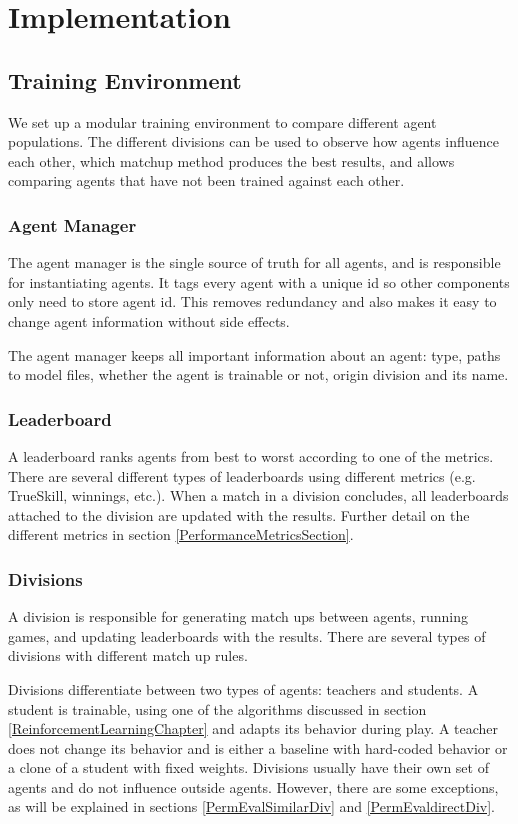 \chapter{Implementation}

\section{Training Environment}
We set up a modular training environment to compare different agent populations. The different divisions can be used to observe how agents influence each other, which matchup method produces the best results, and allows comparing agents that have not been trained against each other.

\subsection{Agent Manager}
The agent manager is the single source of truth for all agents, and is responsible for instantiating agents. It tags every agent with a unique id so other components only need to store agent id. This removes redundancy and also makes it easy to change agent information without side effects.

The agent manager keeps all important information about an agent: type, paths to model files, whether the agent is trainable or not, origin division and its name.

\subsection{Leaderboard}
A leaderboard ranks agents from best to worst according to one of the metrics. There are several different types of leaderboards using different metrics (e.g. TrueSkill, winnings, etc.). When a match in a division concludes, all leaderboards attached to the division are updated with the results. Further detail on the different metrics in section \ref{PerformanceMetricsSection}.

\subsection{Divisions}
A division is responsible for generating match ups between agents, running games, and updating leaderboards with the results. There are several types of divisions with different match up rules.

Divisions differentiate between two types of agents: teachers and students. A student is trainable, using one of the algorithms discussed in section \ref{ReinforcementLearningChapter} and adapts its behavior during play. A teacher does not change its behavior and is either a baseline with hard-coded behavior or a clone of a student with fixed weights. Divisions usually have their own set of agents and do not influence outside agents. However, there are some exceptions, as will be explained in sections \ref{PermEvalSimilarDiv} and \ref{PermEvaldirectDiv}.

